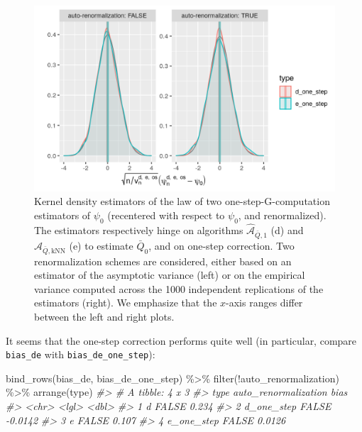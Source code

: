 \documentclass[
  11pt,
  openright,twoside]{book}
\newenvironment{Shaded}{\begin{snugshade}}{\end{snugshade}}
\newcommand{\CommentTok}[1]{\textcolor[rgb]{0.56,0.35,0.01}{\textit{#1}}}
\newcommand{\FunctionTok}[1]{\textcolor[rgb]{0.00,0.00,0.00}{#1}}
\newcommand{\NormalTok}[1]{#1}
\newcommand{\SpecialCharTok}[1]{\textcolor[rgb]{0.00,0.00,0.00}{#1}}
\newcommand{\Algo}{\widehat{\mathcal{A}}}
\newcommand{\Qbar}{\bar{Q}}
\theoremstyle{definition}
\theoremstyle{definition}
\theoremstyle{definition}
\theoremstyle{definition}
\theoremstyle{remark}
\begin{document}
\begin{figure}

{\centering \includegraphics[width=0.7\linewidth]{img/one-step-one-1} 

}

\caption{Kernel density estimators of the law of two one-step-G-computation estimators of \(\psi_{0}\) (recentered with respect to \(\psi_{0}\), and renormalized). The estimators respectively hinge on algorithms \(\Algo_{\Qbar,1}\) (d) and \(\Algo_{\Qbar,\text{kNN}}\) (e) to estimate \(\Qbar_{0}\), and on one-step correction. Two renormalization schemes are considered, either based on an estimator of the asymptotic variance (left) or on the empirical variance computed across the 1000 independent replications of the estimators (right). We emphasize that the \(x\)-axis ranges differ between the left and right plots.}\label{fig:one-step-one}
\end{figure}

It seems that the one-step correction performs quite well (in particular,
compare \texttt{bias\_de} with \texttt{bias\_de\_one\_step}):

\begin{Shaded}
\begin{Highlighting}[]
\FunctionTok{bind\_rows}\NormalTok{(bias\_de, bias\_de\_one\_step) }\SpecialCharTok{\%\textgreater{}\%}
  \FunctionTok{filter}\NormalTok{(}\SpecialCharTok{!}\NormalTok{auto\_renormalization) }\SpecialCharTok{\%\textgreater{}\%}
  \FunctionTok{arrange}\NormalTok{(type)}
\CommentTok{\#\textgreater{} \# A tibble: 4 x 3}
\CommentTok{\#\textgreater{}   type       auto\_renormalization    bias}
\CommentTok{\#\textgreater{}   \textless{}chr\textgreater{}      \textless{}lgl\textgreater{}                  \textless{}dbl\textgreater{}}
\CommentTok{\#\textgreater{} 1 d          FALSE                 0.234 }
\CommentTok{\#\textgreater{} 2 d\_one\_step FALSE                {-}0.0142}
\CommentTok{\#\textgreater{} 3 e          FALSE                 0.107 }
\CommentTok{\#\textgreater{} 4 e\_one\_step FALSE                 0.0126}
\end{Highlighting}
\end{Shaded}
\end{document}
